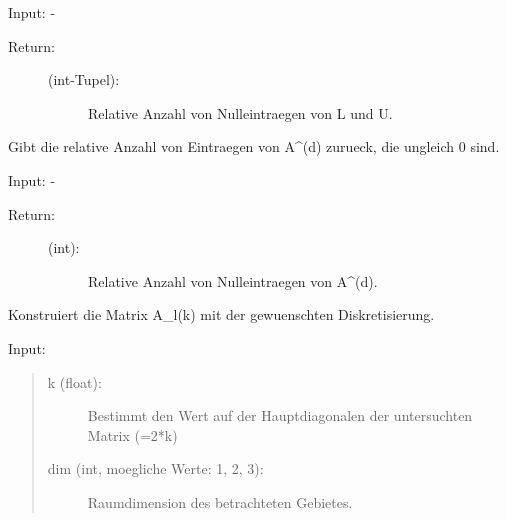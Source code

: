 \documentclass[letterpaper,10pt,ngerman]{sphinxmanual}
\begin{document}
\begin{fulllineitems}
\begin{fulllineitems}
Input: -
\begin{description}
\item[{Return:}] \leavevmode\begin{description}
\item[{(int-Tupel):}] \leavevmode
Relative Anzahl von Nulleintraegen von L und U.

\end{description}

\end{description}

\end{fulllineitems}


\begin{fulllineitems}
\label{\detokenize{index:sparse_erw.Sparse.anz_nn_rel}}
Gibt die relative Anzahl von Eintraegen von A\textasciicircum{}(d) zurueck, die ungleich 0 sind.

Input: -
\begin{description}
\item[{Return:}] \leavevmode\begin{description}
\item[{(int):}] \leavevmode
Relative Anzahl von Nulleintraegen von A\textasciicircum{}(d).

\end{description}

\end{description}

\end{fulllineitems}


\begin{fulllineitems}
\label{\detokenize{index:sparse_erw.Sparse.constr_mat_l_k}}
Konstruiert die Matrix A\_l(k) mit der gewuenschten Diskretisierung.

Input:
\begin{quote}
\begin{description}
\item[{k (float):}] \leavevmode
Bestimmt den Wert auf der Hauptdiagonalen der untersuchten Matrix (=2*k)

\item[{dim (int, moegliche Werte: 1, 2, 3):}] \leavevmode
Raumdimension des betrachteten Gebietes.


\end{description}
\end{quote}
\end{fulllineitems}
\end{fulllineitems}
\end{document}

